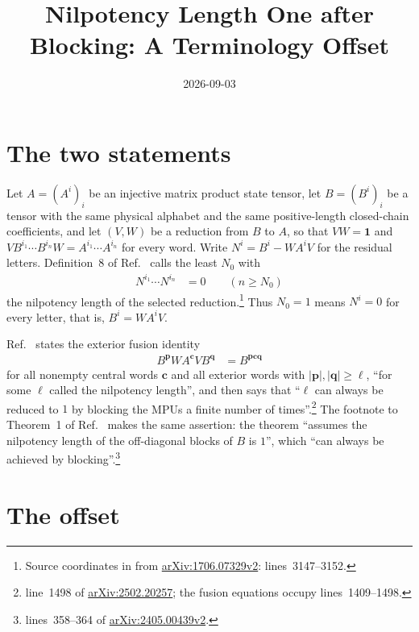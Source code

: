 \documentclass{article}
\title{Nilpotency Length One after Blocking: A Terminology Offset}
\author{}
\date{2026-09-03}
\begin{document}
\maketitle
{}

\section{The two statements}

Let $A=(A^i)_i$ be an injective matrix product state tensor, let
$B=(B^i)_i$ be a tensor with the same physical alphabet and the same
positive-length closed-chain coefficients, and let $(V,W)$ be a reduction
from $B$ to $A$, so that $VW=\mathbf 1$ and
$VB^{i_1}\cdots B^{i_n}W=A^{i_1}\cdots A^{i_n}$ for every word.  Write
$N^i=B^i-WA^iV$ for the residual letters.  Definition~8 of
Ref.~\cite{Molnar2018SemiInjective} calls the least $N_0$ with
\begin{align}
    N^{i_1}\cdots N^{i_n}
        &=0
        \qquad (n\geq N_0)
    \label{eq:mgsc18_nilpotency_length_one_definition}
\end{align}
the nilpotency length of the selected reduction.\footnote{Source
    coordinates in  from
    \href{https://arxiv.org/abs/1706.07329v2}{arXiv:1706.07329v2}:
    lines~3147--3152.}
Thus $N_0=1$ means $N^i=0$ for every letter, that is, $B^i=WA^iV$.

Ref.~\cite{FrancoRubio2025MPUGauging} states the exterior fusion identity
\begin{align}
    B^{\mathbf p}WA^{\mathbf c}VB^{\mathbf q}
        &=B^{\mathbf p\mathbf c\mathbf q}
    \label{eq:mgsc18_nilpotency_length_one_exterior_identity}
\end{align}
for all nonempty central words $\mathbf c$ and all exterior words with
$|\mathbf p|,|\mathbf q|\geq\ell$, ``for some $\ell$ called the nilpotency
length'', and then says that ``$\ell$ can always be reduced to $1$ by
blocking the MPUs a finite number of times''.\footnote{
    line~1498 of \href{https://arxiv.org/abs/2502.20257}{arXiv:2502.20257};
    the fusion equations occupy lines~1409--1498.}
The footnote to Theorem~1 of Ref.~\cite{GarreRubioSchuch2024DomainWall}
makes the same assertion: the theorem ``assumes the nilpotency length of
the off-diagonal blocks of $B$ is $1$'', which ``can always be achieved by
blocking''.\footnote{ lines~358--364 of
    \href{https://arxiv.org/abs/2405.00439v2}{arXiv:2405.00439v2}.}

\section{The offset}
\end{document}
